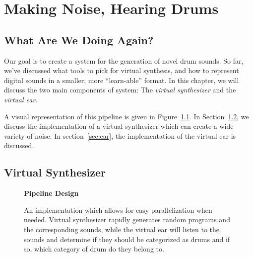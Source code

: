 \documentclass[\main/thesis.tex]{subfiles}
\begin{document}
\chapter{Making Noise, Hearing Drums}
\label{implementation}


\section{What Are We Doing Again?}
Our goal is to create a system for the generation of novel drum sounds. So far, we've discussed what tools to pick for virtual synthesis, and how to represent digital sounds in a smaller, more \enquote{learn-able} format. In this chapter, we will discuss the two main components of  system: The \textit{virtual synthesizer} and the \textit{virtual ear}.

A visual representation of this pipeline is given in  Figure~\ref{fig:pipeline_outline}. In Section~\ref{vs}, we discuss the implementation of a virtual synthesizer which can create a wide variety of noise. In section~\ref{sec:ear}, the implementation of the virtual ear is discussed.


\section{Virtual Synthesizer}
\label{vs}
 \begin{figure}[h!]
    \begin{center}
    \textbf{Pipeline Design}
    \end{center}
    \caption{An implementation which allows for easy parallelization when needed. Virtual synthesizer rapidly generates random programs and the corresponding sounds, while the virtual ear will listen to the sounds and determine if they should be categorized as drums and if so, which category of drum do they belong to. 
    }
\label{fig:pipeline_outline}
\end{figure}
\end{document}

